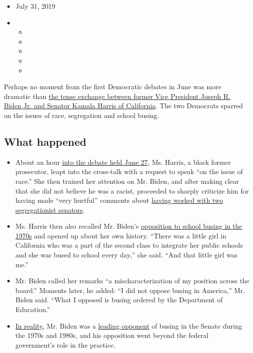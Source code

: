 \begin{itemize}
\item
  July 31, 2019
\item
  \begin{itemize}
  \item
  \item
  \item
  \item
  \item
  \end{itemize}
\end{itemize}

Perhaps no moment from the first Democratic debates in June was more
dramatic than
\href{https://www.nytimes.com/2019/06/27/us/politics/kamala-harris-joe-biden-busing.html}{the
tense exchange between former Vice President Joseph R. Biden Jr. and
Senator Kamala Harris of California}. The two Democrats sparred on the
issues of race, segregation and school busing.

\hypertarget{what-happened}{%
\subsection{What happened}\label{what-happened}}

\begin{itemize}
\item
  About an hour
  \href{https://www.nytimes.com/2019/06/27/us/politics/democratic-debate-recap.html?module=inline}{into
  the debate held June 27}, Ms. Harris, a black former prosecutor, leapt
  into the cross-talk with a request to speak ``on the issue of race.''
  She then trained her attention on Mr. Biden, and after making clear
  that she did not believe he was a racist, proceeded to sharply
  criticize him for having made ``very hurtful'' comments about
  \href{https://www.nytimes.com/2019/06/19/us/politics/biden-segregationists.html?module=inline}{having
  worked with two segregationist senators}.
\item
  Ms. Harris then also recalled Mr. Biden's
  \href{https://www.nytimes.com/2019/06/27/us/politics/factcheck-democratic-debate.html?module=inline}{opposition
  to school busing in the 1970s} and opened up about her own history.
  ``There was a little girl in California who was a part of the second
  class to integrate her public schools and she was bused to school
  every day,'' she said. ``And that little girl was me.''
\item
  Mr. Biden called her remarks ``a mischaracterization of my position
  across the board.'' Moments later, he added: ``I did not oppose busing
  in America,'' Mr. Biden said. ``What I opposed is busing ordered by
  the Department of Education.''
\item
  \href{https://www.nytimes.com/2019/06/27/us/politics/factcheck-democratic-debate.html?module=inline}{In
  reality,} Mr. Biden was a
  \href{https://www.nytimes.com/2019/06/21/us/politics/joe-biden-james-eastland.html?module=inline}{leading
  opponent} of busing in the Senate during the 1970s and 1980s, and his
  opposition went beyond the federal government's role in the practice.
\end{itemize}

